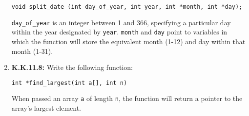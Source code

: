 \documentclass[12pt]{article}
\begin{document}
\begin{enumerate}[1.]
    \bigskip

    \texttt{void split\_date (int day\_of\_year, int year, int *month, int *day);}

    \bigskip

    \texttt{day\_of\_year} is an integer between 1 and 366, specifying a particular day within
    the year designated by \texttt{year}. \texttt{month} and \texttt{day} point to variables in which the
    function will store the equivalent month (1-12) and day within that month
    (1-31).

    \item \textbf{K.K.11.8:} Write the following function:

    \bigskip

    \texttt{int *find\_largest(int a[], int n)}

    \bigskip

    When passed an array \texttt{a} of length \texttt{n}, the function will return a pointer to
    the array's largest element.


\end{enumerate}
\end{document}
